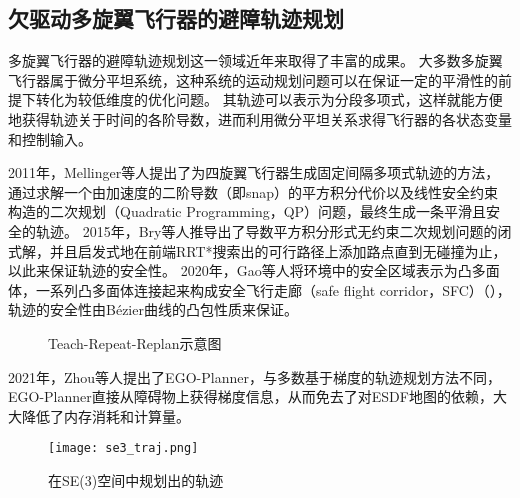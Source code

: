 \subsection{欠驱动多旋翼飞行器的避障轨迹规划}
多旋翼飞行器的避障轨迹规划这一领域近年来取得了丰富的成果。
大多数多旋翼飞行器属于微分平坦系统\cite{2003Flatness}，这种系统的运动规划问题可以在保证一定的平滑性的前提下转化为较低维度的优化问题。
其轨迹可以表示为分段多项式，这样就能方便地获得轨迹关于时间的各阶导数，进而利用微分平坦关系求得飞行器的各状态变量和控制输入。

2011年，Mellinger等人提出了为四旋翼飞行器生成固定间隔多项式轨迹的方法\cite{2011minimumsnap}，通过求解一个由加速度的二阶导数（即snap）的平方积分代价以及线性安全约束构造的二次规划（Quadratic Programming，QP）问题，最终生成一条平滑且安全的轨迹。
2015年，Bry等人推导出了导数平方积分形式无约束二次规划问题的闭式解\cite{bry2015aggressive}，并且启发式地在前端RRT*搜索出的可行路径上添加路点直到无碰撞为止，以此来保证轨迹的安全性。
2020年，Gao等人将环境中的安全区域表示为凸多面体\cite{gao2020teach}，一系列凸多面体连接起来构成安全飞行走廊（safe flight corridor，SFC）（），轨迹的安全性由B\'{e}zier曲线的凸包性质来保证。
\begin{figure}[!ht]
    \setlength{\subfigcapskip}{-1bp}
    \centering
    \begin{minipage}{\textwidth}

    \centering
    \subfigure{\label{fig:ttr_corridor}}\addtocounter{subfigure}{-2}
    \hspace{0.2em}
    \subfigure{\label{fig:ttr_trajectory}}\addtocounter{subfigure}{-2}
    
    \end{minipage}
    \caption{Teach-Repeat-Replan示意图\cite{gao2020teach}}
    \label{fig:TTR}
\end{figure}
2021年，Zhou等人提出了EGO-Planner，与多数基于梯度的轨迹规划方法不同，EGO-Planner直接从障碍物上获得梯度信息，从而免去了对ESDF地图的依赖，大大降低了内存消耗和计算量。

\begin{figure}[ht]
    \centering
    \texttt{[image: se3\_traj.png]}
    \caption{在SE(3)空间中规划出的轨迹\cite{2021Fast}}
    \label{fig:se3_traj}
\end{figure}

